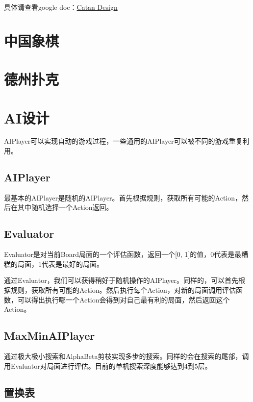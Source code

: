\documentclass[export, 12pt, letterpaper]{ctexrep}
\begin{document}
具体请查看google doc：\href{https://docs.google.com/document/d/1gYzo6ib2sot4ynA650sstkFq2iVueK_y3jLf3UaaeWU/edit?usp=sharing}{Catan Design}

 

\chapter{中国象棋}

\begin{center}

\end{center}


\chapter{德州扑克}

\chapter{AI设计}

AIPlayer可以实现自动的游戏过程，一些通用的AIPlayer可以被不同的游戏重复利用。


\section{AIPlayer}
最基本的AIPlayer是随机的AIPlayer。首先根据规则，获取所有可能的Action，然后在其中随机选择一个Action返回。


\section{Evaluator}

Evaluator是对当前Board局面的一个评估函数，返回一个[0, 1]的值，0代表是最糟糕的局面，1代表是最好的局面。

通过Evaluator，我们可以获得稍好于随机操作的AIPlayer。同样的，可以首先根据规则，获取所有可能的Action。然后执行每个Action，对新的局面调用评估函数，可以得出执行哪一个Action会得到对自己最有利的局面，然后返回这个Action。

\section{MaxMinAIPlayer}

通过极大极小搜索和AlphaBeta剪枝实现多步的搜索。同样的会在搜索的尾部，调用Evaluator对局面进行评估。目前的单机搜索深度能够达到4到5层。

\section{置换表}
\end{document}

